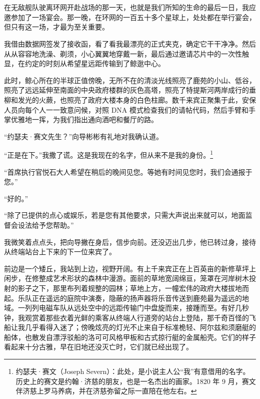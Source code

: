 \documentclass[AutoFakeBold=true]{book}
\begin{document}
\newpage
\pagestyle{headings}

\part{}

\chapter{}

在无敌舰队驶离环网开赴战场的那一天，也就是我们所知的生命的最后一日，我应邀参加了一场宴会。那一晚，在环网的一百五十多个星球上，处处都在举行宴会，但只有这一场，才最为至关重要。

我借由数据网签发了接收函，看了看我最漂亮的正式夹克，确定它干干净净。然后从从容容地洗澡、剃须，小心翼翼地穿戴一新，最后通过邀请芯片中的一次性触显，在约定的时刻从希望星远距传输到了鲸逖中心。

此时，鲸心所在的半球正值傍晚，无所不在的清淡光线照亮了鹿苑的小山、低谷，照亮了远远延伸至南面的中央政府楼群的灰色高塔，照亮了特提斯河两岸成行的垂柳和发光的火蕨，也照亮了政府大楼本身的白色柱廊。数千来宾正聚集于此，安保人员向每个人一一致意问候，对照 DNA 模式检查我们的请帖代码，然后手臂和手掌优雅地一挥，为我们指出通向酒吧和餐厅的路。

``约瑟夫·赛文先生？''向导彬彬有礼地对我确认道。

``正是在下。''我撒了谎。这是我现在的名字，但从来不是我的身份。\footnote{约瑟夫·赛文（Joseph Severn）：此处，是小说主人公``我''有意借用的名字。历史上的赛文是约翰·济慈的朋友，也是一名杰出的画家。1820 年 9 月，赛文伴济慈上罗马养病，并在济慈弥留之际一直陪在他左右。}

``首席执行官悦石大人希望在稍后的晚间见您。等她有时间见您时，我们会通报于您。''

``好的。''

``除了已提供的点心或娱乐，若是您有其他要求，只需大声说出来就可以，地面监督会设法给予您帮助。''

我微笑着点点头，把向导撇在身后，信步向前。还没迈出几步，他已转过身，接待从终端站台上下来的下一位来宾了。

前边是一个矮丘，我站到上边，视野开阔。有上千来宾正在上百英亩的新修草坪上闲步，在修整成艺术形状的森林中漫游。面前的草地宽阔绵亘，笼罩在河岸树木投射的影子之下，那里布列着规整的园林；草地上方，一幢宏伟的政府大楼拔地而起。乐队正在遥远的庭院中演奏，隐蔽的扬声器将乐音传送到鹿苑最为遥远的地域。一列列电磁车队从远处空中的远距传输门中盘旋而来，接踵而至。有好几秒钟，我观赏着那些衣着光鲜的乘客从终端人行道旁的站台上登陆，那千奇百怪的飞船让我几乎看得入迷了；傍晚炫亮的灯光不止来自于标准桅轻、阿尔兹和须磨艇的船体，也散发自漂浮驳船的洛可可风格甲板和古式掠行艇的金属船壳。它们的样子看起来十分古雅，早在旧地还没灭亡时，它们就已经出现了。
\end{document}
